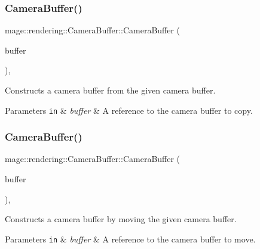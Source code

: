 \subsubsection{\texorpdfstring{Camera\+Buffer()}{CameraBuffer()}\hspace{0.1cm}{\footnotesize\ttfamily [2/3]}}
{\footnotesize\ttfamily mage\+::rendering\+::\+Camera\+Buffer\+::\+Camera\+Buffer (\begin{DoxyParamCaption}\item[{const \hyperlink{structmage_1_1rendering_1_1_camera_buffer}{Camera\+Buffer} \&}]{buffer }\end{DoxyParamCaption})\hspace{0.3cm}{\ttfamily [default]}, {\ttfamily [noexcept]}}

Constructs a camera buffer from the given camera buffer.


\begin{DoxyParams}[1]{Parameters}
\mbox{\tt in}  & {\em buffer} & A reference to the camera buffer to copy. \\
\hline
\end{DoxyParams}
\hypertarget{structmage_1_1rendering_1_1_camera_buffer_a16f0d0938bb4e4174461c3a8c8ad3e20}{}\label{structmage_1_1rendering_1_1_camera_buffer_a16f0d0938bb4e4174461c3a8c8ad3e20} 
\subsubsection{\texorpdfstring{Camera\+Buffer()}{CameraBuffer()}\hspace{0.1cm}{\footnotesize\ttfamily [3/3]}}
{\footnotesize\ttfamily mage\+::rendering\+::\+Camera\+Buffer\+::\+Camera\+Buffer (\begin{DoxyParamCaption}\item[{\hyperlink{structmage_1_1rendering_1_1_camera_buffer}{Camera\+Buffer} \&\&}]{buffer }\end{DoxyParamCaption})\hspace{0.3cm}{\ttfamily [default]}, {\ttfamily [noexcept]}}

Constructs a camera buffer by moving the given camera buffer.


\begin{DoxyParams}[1]{Parameters}
\mbox{\tt in}  & {\em buffer} & A reference to the camera buffer to move. \\
\hline
\end{DoxyParams}
\hypertarget{structmage_1_1rendering_1_1_camera_buffer_aadd09f0ddad88a8463e8dda3ae4e3849}{}\label{structmage_1_1rendering_1_1_camera_buffer_aadd09f0ddad88a8463e8dda3ae4e3849} 
